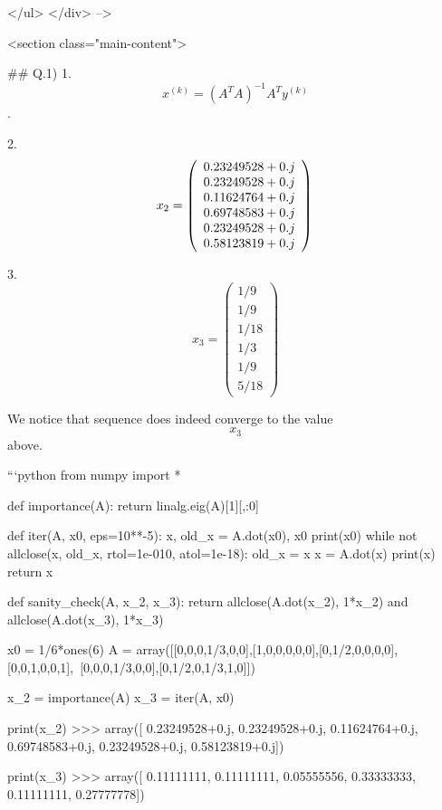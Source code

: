   </ul>
</div> -->


    <section class="main-content">
      
      ## Q.1)
1. 
    $$x^{(k)} = (A^TA)^{-1}A^Ty^{(k)}$$.

2. 
    $$x_2 = \left( \begin{array}{c} 0.23249528+0.j \\ 0.23249528+0.j \\ 0.11624764+0.j \\  0.69748583+0.j \\ 0.23249528+0.j \\  0.58123819+0.j \end{array} \right) \\ \\$$


3. 
    $$x_3 = \left( \begin{array}{c} 1/9 \\ 1/9 \\ 1/18 \\ 1/3 \\ 1/9 \\  5/18 \end{array} \right)$$

    We notice that sequence does indeed converge to the value $$x_3$$ above.  


    ```python
        from numpy import *

        def importance(A):
            return linalg.eig(A)[1][,:0]

        def iter(A, x0, eps=10**-5):
            x, old_x = A.dot(x0), x0
            print(x0)
            while not allclose(x, old_x, rtol=1e-010, atol=1e-18):
                old_x = x
                x = A.dot(x)
                print(x)
            return x

        def sanity_check(A, x_2, x_3):
            return allclose(A.dot(x_2), 1*x_2) and allclose(A.dot(x_3), 1*x_3)

        x0 = 1/6*ones(6)
        A = array([[0,0,0,1/3,0,0],[1,0,0,0,0,0],[0,1/2,0,0,0,0],[0,0,1,0,0,1],\
        [0,0,0,1/3,0,0],[0,1/2,0,1/3,1,0]])

        x_2 = importance(A)
        x_3 = iter(A, x0)

        print(x_2)
    >>> array([ 0.23249528+0.j,  0.23249528+0.j,  0.11624764+0.j,  0.69748583+0.j,
        0.23249528+0.j,  0.58123819+0.j])

        print(x_3)
    >>> array([ 0.11111111,  0.11111111,  0.05555556,  0.33333333,  0.11111111,
        0.27777778])

